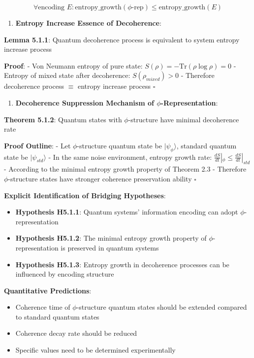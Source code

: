 \begin{equation}
\forall \text{encoding } E: \text{entropy\_growth}(\text{$\phi$-rep}) \leq \text{entropy\_growth}(E)
\end{equation}

\begin{enumerate}
\item \textbf{Entropy Increase Essence of Decoherence}:
\end{enumerate}
   \textbf{Lemma 5.1.1}: Quantum decoherence process is equivalent to system entropy increase process
\label{lemma:5.1.1}
   
   \textbf{Proof}:
   - Von Neumann entropy of pure state: $S(\rho) = -\text{Tr}(\rho \log \rho) = 0$
   - Entropy of mixed state after decoherence: $S(\rho_{mixed}) > 0$
   - Therefore decoherence process $\equiv$ entropy increase process $\square$

\begin{enumerate}
\item \textbf{Decoherence Suppression Mechanism of $\phi$-Representation}:
\end{enumerate}
   \textbf{Theorem 5.1.2}: Quantum states with $\phi$-structure have minimal decoherence rate
\label{thm:5.1.2}
   
   \textbf{Proof Outline}:
   - Let $\phi$-structure quantum state be $|\psi_\phi\rangle$, standard quantum state be $|\psi_{std}\rangle$
   - In the same noise environment, entropy growth rate: $\frac{dS}{dt}|_\phi \leq \frac{dS}{dt}|_{std}$
   - According to the minimal entropy growth property of Theorem 2.3
   - Therefore $\phi$-structure states have stronger coherence preservation ability $\square$

\textbf{Explicit Identification of Bridging Hypotheses}:
\begin{itemize}
\item \textbf{Hypothesis H5.1.1}: Quantum systems' information encoding can adopt $\phi$-representation
\item \textbf{Hypothesis H5.1.2}: The minimal entropy growth property of $\phi$-representation is preserved in quantum systems
\item \textbf{Hypothesis H5.1.3}: Entropy growth in decoherence processes can be influenced by encoding structure
\end{itemize}

\textbf{Quantitative Predictions}:
\begin{itemize}
\item Coherence time of $\phi$-structure quantum states should be extended compared to standard quantum states
\item Coherence decay rate should be reduced
\item Specific values need to be determined experimentally
\end{itemize}

